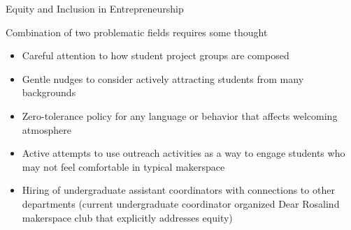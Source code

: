\documentclass[xcolor={dvipsnames},professionalfonts]{beamer}
\begin{document}
\begin{frame}{Equity and Inclusion in Entrepreneurship}
 \begin{block}{Combination of two problematic fields requires some thought}
  \begin{itemize}
   \item Careful attention to how student project groups are composed
   \item Gentle nudges to consider actively attracting students from many backgrounds
   \item Zero-tolerance policy for any language or behavior that affects welcoming atmosphere
   \item Active attempts to use outreach activities as a way to engage students who may not feel comfortable in typical makerspace
   \item Hiring of undergraduate assistant coordinators with connections to other departments (current undergraduate coordinator organized Dear Rosalind makerspace club that explicitly addresses equity)
  \end{itemize}
 \end{block}
\end{frame}

\end{document}
